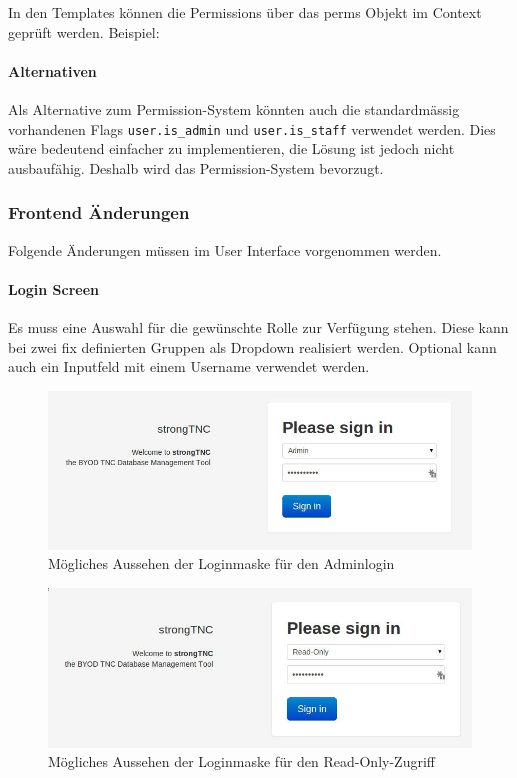 In den Templates können die Permissions über das perms Objekt im Context geprüft werden. 
Beispiel:


\paragraph*{Alternativen}

Als Alternative zum Permission-System könnten auch die standardmässig vorhandenen Flags 
\texttt{user.is\_admin} und \texttt{user.is\_staff} verwendet werden. Dies wäre bedeutend 
einfacher zu implementieren, die Lösung ist jedoch nicht ausbaufähig. Deshalb wird das 
Permission-System bevorzugt.


\subsubsection{Frontend Änderungen}
Folgende Änderungen müssen im User Interface vorgenommen werden.

\paragraph*{Login Screen}

Es muss eine Auswahl für die gewünschte Rolle zur Verfügung stehen. Diese kann bei zwei fix 
definierten Gruppen als Dropdown realisiert werden. Optional kann auch ein Inputfeld mit einem 
Username verwendet werden. 

\begin{figure}[H]
	\centering
	\includegraphics[width=\textwidth]{images/rollen-konzept/login-admin.jpg}
	\caption{Mögliches Aussehen der Loginmaske für den Adminlogin}
\end{figure}

\begin{figure}[H]
	\centering
	\includegraphics[width=\textwidth]{images/rollen-konzept/login-read-only.jpg}
	\caption{Mögliches Aussehen der Loginmaske für den Read-Only-Zugriff}
\end{figure}

